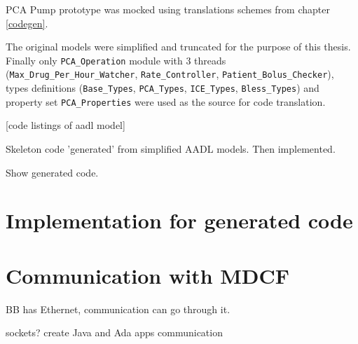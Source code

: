 PCA Pump prototype was mocked using translations schemes from chapter \ref{codegen}.

The original models were simplified and truncated for the purpose of this thesis. Finally only \lstinline{PCA_Operation} module with 3 threads (\lstinline{Max_Drug_Per_Hour_Watcher}, \lstinline{Rate_Controller}, \lstinline{Patient_Bolus_Checker}), types definitions (\lstinline{Base_Types}, \lstinline{PCA_Types}, \lstinline{ICE_Types}, \lstinline{Bless_Types}) and property set \lstinline{PCA_Properties} were used as the source for code translation.

[code listings of aadl model]


Skeleton code 'generated' from simplified AADL models. Then implemented.

Show generated code.



\section{Implementation for generated code}
\label{pcapumpimpl:codegenimpl}




\section{Communication with MDCF}
\label{pcapumpimpl:mdcf}

BB has Ethernet, communication can go through it.

sockets? create Java and Ada apps communication

